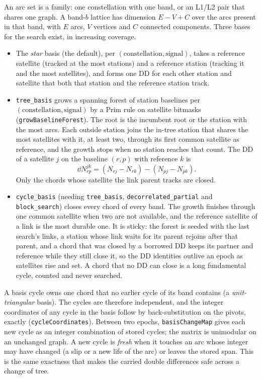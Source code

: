 \documentclass[main.tex]{subfiles}
\begin{document}
An arc set is a family: one constellation with one band, or an L1/L2 pair that
shares one graph.  A band-$b$ lattice has dimension $E - V + C$ over the arcs
present in that band, with $E$ arcs, $V$ vertices and $C$ connected components.
Three bases for the search exist, in increasing coverage.
\begin{itemize}[leftmargin=*, itemsep=0pt]
\item The \emph{star} basis (the default), per
  $(\text{constellation},\text{signal})$, takes a reference satellite (tracked
  at the most stations) and a reference station (tracking it and the most
  satellites), and forms one DD for each other station and satellite that both
  that station and the reference station track.
\item \texttt{tree\_basis} grows a spanning forest of station baselines per
  $(\text{constellation},\text{signal})$ by a Prim rule on satellite bitmasks
  (\texttt{growBaselineForest}).  The root is the incumbent root or the station
  with the most arcs.  Each outside station joins the in-tree station that
  shares the most satellites with it, at least two, through its first common
  satellite as reference, and the growth stops when no station reaches that
  count.  The DD of a satellite $j$ on the baseline $(r,p)$ with reference
  $k$ is
  \begin{equation}
  \dd N^{jk}_{rp} = (N_{rj} - N_{rk}) - (N_{pj} - N_{pk}).
  \label{eq:ar-baseline-dd}
  \end{equation}
  Only the chords whose satellite the link parent tracks are closed.
\item \texttt{cycle\_basis} (needing \texttt{tree\_basis},
  \texttt{decorrelated\_partial} and \texttt{block\_search}) closes every chord
  of every band.  The growth finishes through one common satellite when two
  are not available, and the reference satellite of a link is the most durable
  one.  It is sticky: the forest is seeded with the last search's
  links, a station whose link waits for its parent rejoins after that parent,
  and a chord that was closed by a borrowed DD keeps its partner and reference
  while they still close it, so the DD identities outlive an epoch as
  satellites rise and set.  A chord that no DD can close is a long fundamental
  cycle, counted and never searched.
\end{itemize}

A basis cycle owns one chord that no earlier cycle of its band contains
(a \emph{unit-triangular} basis).  The cycles are therefore independent, and
the integer coordinates of any cycle in the basis follow by back-substitution
on the pivots, exactly (\texttt{cycleCoordinates}).  Between two epochs,
\texttt{basisChangeMap} gives each new cycle as an integer combination of
stored cycles; the matrix is unimodular on an unchanged graph.  A new cycle is
\emph{fresh} when it touches an arc whose integer may have changed (a slip or
a new life of the arc) or leaves the stored span.  This is the same exactness
that makes the carried double differences safe across a change of tree.
\end{document}

